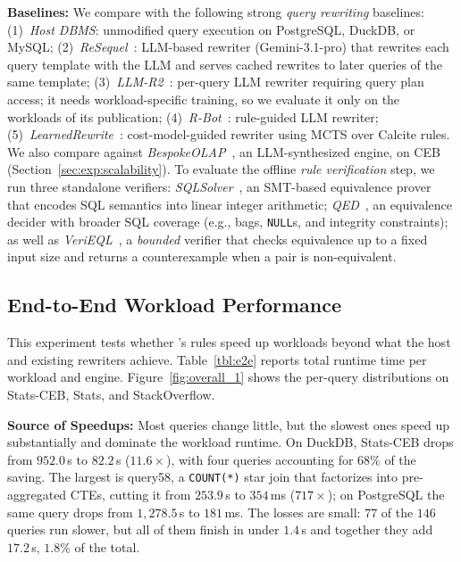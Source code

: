\textbf{Baselines:} We compare with the following strong \emph{query rewriting} baselines:
(1)~\emph{Host DBMS}: unmodified query execution on PostgreSQL, DuckDB, or MySQL;
(2)~\emph{ReSequel}~\cite{resequel}: LLM-based rewriter (Gemini-3.1-pro) that rewrites each query template with the LLM and serves cached rewrites to later queries of the same template;
(3)~\emph{LLM-R2}~\cite{LLMR2}: per-query LLM rewriter requiring query plan access; it needs workload-specific training, so we evaluate it only on the workloads of its publication;
(4)~\emph{R-Bot}~\cite{RBot}: rule-guided LLM rewriter;
(5)~\emph{LearnedRewrite}~\cite{learnedrewrite}: cost-model-guided rewriter using MCTS over Calcite rules.
We also compare against \emph{BespokeOLAP}~\cite{bespokeolap}, an LLM-synthesized engine, on \textsf{CEB} (Section~\ref{sec:exp:scalability}).
To evaluate the offline \emph{rule verification} step, we run three standalone verifiers: \emph{SQLSolver}~\cite{SQLSolver}, an SMT-based equivalence prover that encodes SQL semantics into linear integer arithmetic; \emph{QED}~\cite{QED}, an equivalence decider with broader SQL coverage (e.g., bags, \texttt{NULL}s, and integrity constraints); as well as \emph{VeriEQL}~\cite{VeriEQL}, a \emph{bounded} verifier that checks equivalence up to a fixed input size and returns a counterexample when a pair is non-equivalent.


\subsection{End-to-End Workload Performance}
\label{sec:exp:e2e}
This experiment tests whether {\sys}'s rules speed up workloads beyond what the host and existing rewriters achieve. Table~\ref{tbl:e2e} reports total runtime time per workload and engine. Figure~\ref{fig:overall_1} shows the per-query distributions on \textsf{Stats-CEB}, \textsf{Stats}, and \textsf{StackOverflow}.

\textbf{Source of Speedups:} Most queries change little, but the slowest ones speed up substantially and dominate the workload runtime. On DuckDB, \textsf{Stats-CEB} drops from $952.0$\,s to $82.2$\,s ($11.6\times$), with four queries accounting for $68\%$ of the saving. The largest is \textsf{query58}, a \texttt{COUNT(*)} star join that {\sys} factorizes into pre-aggregated CTEs, cutting it from $253.9$\,s to $354$\,ms ($717\times$); on PostgreSQL the same query drops from $1{,}278.5$\,s to $181$\,ms. The losses are small: $77$ of the $146$ queries run slower, but all of them finish in under $1.4$\,s and together they add $17.2$\,s, $1.8\%$ of the total. %

